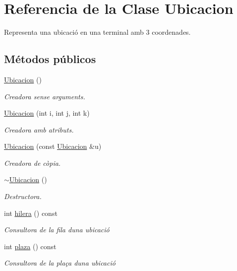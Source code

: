 \hypertarget{class_ubicacion}{}\section{Referencia de la Clase Ubicacion}
\label{class_ubicacion}


Representa una ubicació en una terminal amb 3 coordenades.  


\subsection*{Métodos públicos}
\begin{DoxyCompactItemize}
\item 
\hyperlink{class_ubicacion_a9014ea9ce9297b951a07a668a5fb7cc4}{Ubicacion} ()
\begin{DoxyCompactList}\small\item\em Creadora sense arguments. \end{DoxyCompactList}\item 
\hyperlink{class_ubicacion_a423ae49933ff18f187e1f034d295f4c1}{Ubicacion} (int i, int j, int k)
\begin{DoxyCompactList}\small\item\em Creadora amb atributs. \end{DoxyCompactList}\item 
\hyperlink{class_ubicacion_abbd148f34df6cde35f0f3803c8a98660}{Ubicacion} (const \hyperlink{class_ubicacion}{Ubicacion} \&u)
\begin{DoxyCompactList}\small\item\em Creadora de còpia. \end{DoxyCompactList}\item 
\hyperlink{class_ubicacion_a90a99154b92c9c89053b752f775618d1}{$\sim$\+Ubicacion} ()
\begin{DoxyCompactList}\small\item\em Destructora. \end{DoxyCompactList}\item 
int \hyperlink{class_ubicacion_abf00d08075e75ac833de7357ebc6f521}{hilera} () const
\begin{DoxyCompactList}\small\item\em Consultora de la fila d\textquotesingle{}una ubicació \end{DoxyCompactList}\item 
int \hyperlink{class_ubicacion_abed323ffb2eace375e80bc395fdaeb39}{plaza} () const
\begin{DoxyCompactList}\small\item\em Consultora de la plaça d\textquotesingle{}una ubicació \end{DoxyCompactList}\item 

\end{DoxyCompactItemize}
